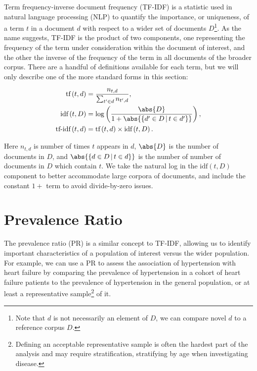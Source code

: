 Term frequency-inverse document frequency (TF-IDF) is a statistic
used in natural language processing (NLP) to quantify
the importance, or uniqueness, of a term $t$ in a document $d$
with respect to a wider set of documents $D$\footnote{Note that $d$ is not necessarily an element of $D$, we can compare novel $d$ to a reference corpus $D$.}.
As the name suggests, TF-IDF is the product of two components,
one representing the frequency of the term under consideration within the document of interest,
and the other the inverse of the frequency of the term in all documents of the broader corpus.
There are a handful of definitions available for each term, but we will only describe
one of the more standard forms in this section:

\begin{subequations}\label{eq:unsupervised:tfidf}
\begin{align}
\text{tf}\left(t,d\right) &= \frac{n_{t,d}}{\sum_{t' \in d} n_{t',d}}, \label{eq:unsupervised:tfidf:tf} \\
\text{idf}\left(t,D\right) &= \log\left(\frac{\abs{D}}{1 + \abs{\left\{d' \in D \, | \, t \in d'\right\}}}\right), \label{eq:unsupervised:tfidf:idf} \\
\text{tf-idf}\left(t,d\right) &= \text{tf}\left(t,d\right) \times \text{idf}\left(t,D\right). \label{eq:unsupervised:tfidf:tfidf}
\end{align}
\end{subequations}

\noindent Here $n_{t,d}$ is number of times $t$ appears in $d$,
$\abs{D}$ is the number of documents in $D$,
and $\abs{\left\{d \in D \, | \, t \in d\right\}}$ is the number of number of documents in $D$ which contain $t$.
We take the natural log in the $\text{idf}\left(t,D\right)$ component to better accommodate large corpora of documents,
and include the constant $1+$ term to avoid divide-by-zero issues.

\section{Prevalence Ratio}
\label{dim_reduct:prevalence_ratio}

The prevalence ratio (PR) is a similar concept to TF-IDF,
allowing us to identify important characteristics of a population of interest versus the wider population.
For example, we can use a PR to assess the association of hypertension with heart failure by comparing
the prevalence of hypertension in a cohort of heart failure patients
to the prevalence of hypertension in the general population,
or at least a representative sample\footnote{Defining an acceptable representative sample is often the hardest part of the analysis and may require stratification, \eg stratifying by age when investigating disease.} of it.

